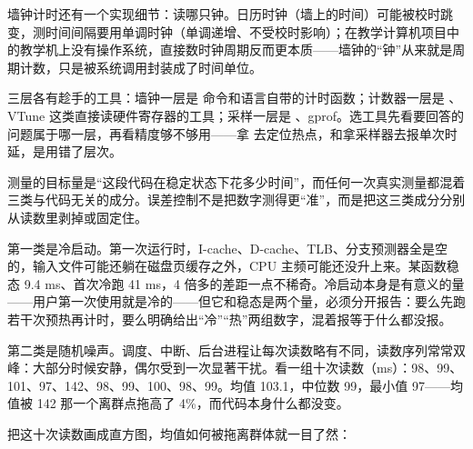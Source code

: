 墙钟计时还有一个实现细节：读哪只钟。日历时钟（墙上的时间）可能被校时跳变，测时间间隔要用单调时钟（单调递增、不受校时影响）；在教学计算机项目中的教学机上没有操作系统，直接数时钟周期反而更本质——墙钟的“钟”从来就是周期计数，只是被系统调用封装成了时间单位。

三层各有趁手的工具：墙钟一层是  命令和语言自带的计时函数；计数器一层是 、VTune 这类直接读硬件寄存器的工具；采样一层是 、gprof。选工具先看要回答的问题属于哪一层，再看精度够不够用——拿  去定位热点，和拿采样器去报单次时延，是用错了层次。

测量的目标量是“这段代码在稳定状态下花多少时间”，而任何一次真实测量都混着三类与代码无关的成分。误差控制不是把数字测得更“准”，而是把这三类成分分别从读数里剥掉或固定住。

第一类是冷启动。第一次运行时，I-cache、D-cache、TLB、分支预测器全是空的，输入文件可能还躺在磁盘页缓存之外，CPU 主频可能还没升上来。某函数稳态 9.4 ms、首次冷跑 41 ms，4 倍多的差距一点不稀奇。冷启动本身是有意义的量——用户第一次使用就是冷的——但它和稳态是两个量，必须分开报告：要么先跑若干次预热再计时，要么明确给出“冷”“热”两组数字，混着报等于什么都没报。

第二类是随机噪声。调度、中断、后台进程让每次读数略有不同，读数序列常常双峰：大部分时候安静，偶尔受到一次显著干扰。看一组十次读数（ms）：98、99、101、97、142、98、99、100、98、99。均值 103.1，中位数 99，最小值 97——均值被 142 那一个离群点拖高了 4\%，而代码本身什么都没变。

把这十次读数画成直方图，均值如何被拖离群体就一目了然：

